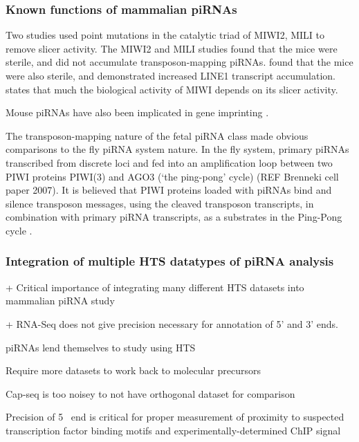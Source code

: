 {    \subsubsection{Known functions of mammalian piRNAs}

      Two studies \citep{DeFazio2011,Reuter2011} used point mutations in the catalytic triad of MIWI2, MILI to remove slicer activity. The MIWI2 and MILI studies found that the mice were sterile, and did not accumulate transposon-mapping piRNAs. \citet{DeFazio2011} found that the mice were also sterile, and demonstrated increased LINE1 transcript accumulation.  \citet{Reuter2011} states that much the biological activity of MIWI depends on its slicer activity.

      Mouse piRNAs have also been implicated in gene imprinting \citep{Watanabe2011}. 

      The transposon-mapping nature of the fetal piRNA class made obvious comparisons to the fly piRNA system nature. In the fly system, primary piRNAs transcribed from discrete loci and fed into an amplification loop between two PIWI proteins PIWI(3) and AGO3 (‘the ping-pong’ cycle) (REF Brenneki cell paper 2007). It is believed that PIWI proteins loaded with piRNAs bind and silence transposon messages, using the cleaved transposon transcripts, in combination with primary piRNA transcripts, as a substrates in the Ping-Pong cycle . 

    \subsubsection{Integration of multiple HTS datatypes of piRNA analysis}
      

      + Critical importance of integrating many different HTS datasets into mammalian piRNA study
      
      + RNA-Seq does not give precision necessary for annotation of 5' and 3' ends.
      
      piRNAs lend themselves to study using HTS
      
      Require more datasets to work back to molecular precursors

      Cap-seq is too noisey to not have orthogonal dataset for comparison
      
      Precision of 5\textprime~ end is critical for proper measurement of proximity to suspected transcription factor binding motifs and experimentally-determined ChIP signal
    
}
